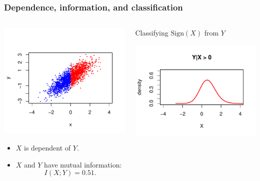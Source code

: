 \documentclass{beamer}
\begin{document}
\begin{frame}
\frametitle{Dependence, information, and classification}
\begin{columns}
\begin{column}{0.5\textwidth}
\begin{center}
\includegraphics[scale = 0.4, clip = true, trim = 0.1in 0.1in 0.1in 0.2in]{../diagram/ddi_2a.pdf}
\end{center}
\begin{itemize}
\item $X$ is dependent of $Y$.
\item $X$ and $Y$ have mutual information:
\[
I(X; Y) = 0.51.
\]
\end{itemize}
\end{column}
\begin{column}{0.5\textwidth}
\begin{center}
Classifying $\text{Sign}(X)$ from $Y$

\includegraphics[scale = 0.4, clip = true, trim = 0.1in 0.9in 0.1in 0.2in]{../diagram/ddi_2b.pdf}


\end{center}
\end{column}
\end{columns}
\end{frame}
\end{document}
